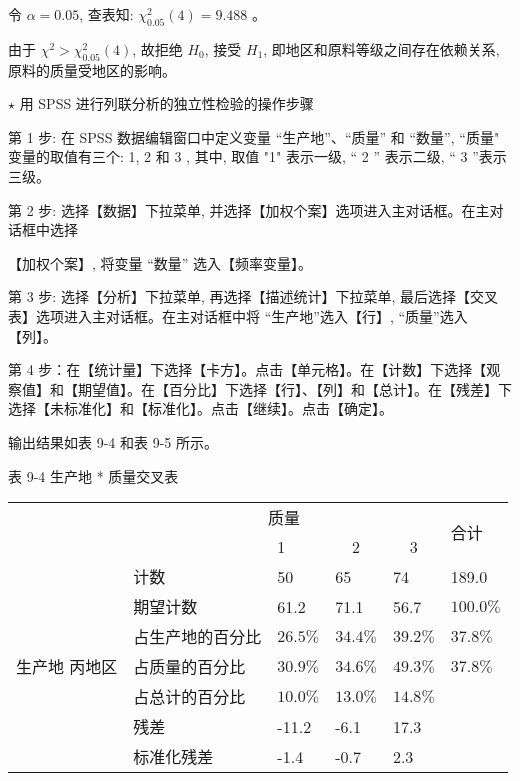 \documentclass[10pt]{article}
\begin{document}
\begin{CJK*}{UTF8}{bsmi}
令 $\alpha=0.05$, 查表知: $\chi_{0.05}^{2}(4)=9.488$ 。

由于 $\chi^{2}>\chi_{0.05}^{2}(4)$, 故拒绝 $H_{0}$, 接受 $H_{1}$, 即地区和原料等级之间存在依赖关系, 原料的质量受地区的影响。

$\star$ 用 SPSS 进行列联分析的独立性检验的操作步骤

第 1 步: 在 SPSS 数据编辑窗口中定义变量 “生产地”、“质量” 和 “数量”, “质量" 变量的取值有三个: 1, 2 和 3 , 其中, 取值 "1" 表示一级, “ 2 ” 表示二级, “ 3 ”表示三级。

第 2 步: 选择【数据】下拉菜单, 并选择【加权个案】选项进入主对话框。在主对话框中选择

【加权个案】, 将变量 “数量” 选入【频率变量】。

第 3 步: 选择【分析】下拉菜单, 再选择【描述统计】下拉菜单, 最后选择【交叉表】选项进入主对话框。在主对话框中将 “生产地”选入【行】, “质量”选入【列】。

第 4 步：在【统计量】下选择【卡方】。点击【单元格】。在【计数】下选择【观察值】和【期望值】。在【百分比】下选择【行】、【列】和【总计】。在【残差】下选择【未标准化】和【标准化】。点击【继续】。点击【确定】。

输出结果如表 9-4 和表 9-5 所示。

表 9-4 生产地 * 质量交叉表

\begin{center}
\begin{tabular}{llllll}
\hline
 & \multicolumn{4}{c}{质量} & \multirow{2}{*}{合计} \\
\cline { 3 - 5 }
 &  & 1 & \multicolumn{1}{c}{2} & \multicolumn{1}{c}{3} &  \\
 & 计数 & 50 & 65 & 74 & 189.0 \\
 & 期望计数 & 61.2 & 71.1 & 56.7 & $100.0 \%$ \\
 & 占生产地的百分比 & $26.5 \%$ & $34.4 \%$ & $39.2 \%$ & $37.8 \%$ \\
生产地 丙地区 & 占质量的百分比 & $30.9 \%$ & $34.6 \%$ & $49.3 \%$ & $37.8 \%$ \\
 & 占总计的百分比 & $10.0 \%$ & $13.0 \%$ & $14.8 \%$ &  \\
 & 残差 & -11.2 & -6.1 & 17.3 &  \\
 & 标准化残差 & -1.4 & -0.7 & 2.3 &  \\
\hline
\end{tabular}
\end{center}

\begin{center}
\end{center}


\end{CJK*}
\end{document}
